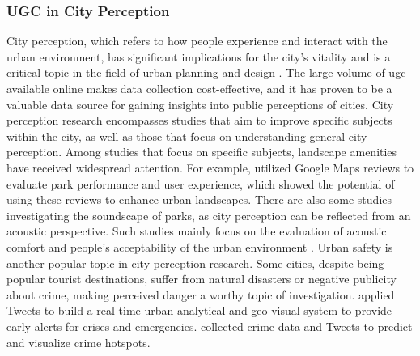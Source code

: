 \documentclass{article}
\begin{document}
\subsubsection{UGC in City Perception}
City perception, which refers to how people experience and interact with the urban environment, has significant implications for the city's vitality and is a critical topic in the field of urban planning and design \citep{jacobs_death_1961}. The large volume of \acrshort{ugc} available online makes data collection cost-effective, and it has proven to be a valuable data source for gaining insights into public perceptions of cities. City perception research encompasses studies that aim to improve specific subjects within the city, as well as those that focus on understanding general city perception. Among studies that focus on specific subjects, landscape amenities have received widespread attention. For example, \cite{huang_user_2022} utilized Google Maps reviews to evaluate park performance and user experience, which showed the potential of using these reviews to enhance urban landscapes. There are also some studies investigating the soundscape of parks, as city perception can be reflected from an acoustic perspective. Such studies mainly focus on the evaluation of acoustic comfort and people's acceptability of the urban environment \citep{tse_perception_2012, liu_effects_2014}. Urban safety is another popular topic in city perception research. Some cities, despite being popular tourist destinations, suffer from natural disasters or negative publicity about crime, making perceived danger a worthy topic of investigation. \cite{yao_towards_2020} applied Tweets to build a real-time urban analytical and geo-visual system to provide early alerts for crises and emergencies. \cite{yang_crimetelescope_2018} collected crime data and Tweets to predict and visualize crime hotspots.
\end{document}
